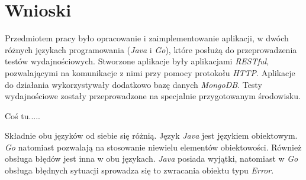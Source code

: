 \chapter{Wnioski}

Przedmiotem pracy było opracowanie i zaimplementowanie aplikacji, w dwóch różnych językach programowania (\textsl{Java} i \textsl{Go}), które posłużą do przeprowadzenia testów wydajnościowych. Stworzone aplikacje były aplikacjami \textsl{RESTful}, pozwalającymi na komunikacje z nimi przy pomocy protokołu \textsl{HTTP}. Aplikacje do działania wykorzystywały dodatkowo bazę danych \textsl{MongoDB}. Testy wydajnościowe zostały przeprowadzone na specjalnie przygotowanym środowisku.

Coś tu.....

Składnie obu języków od siebie się różnią. Język \textsl{Java} jest językiem obiektowym. \textsl{Go} natomiast pozwalają na stosowanie niewielu elementów obiektowości. Również obsługa błędów jest inna w obu językach. \textsl{Java} posiada wyjątki, natomiast w \textsl{Go} obsługa błędnych sytuacji sprowadza się to zwracania obiektu typu \textsl{Error}.
